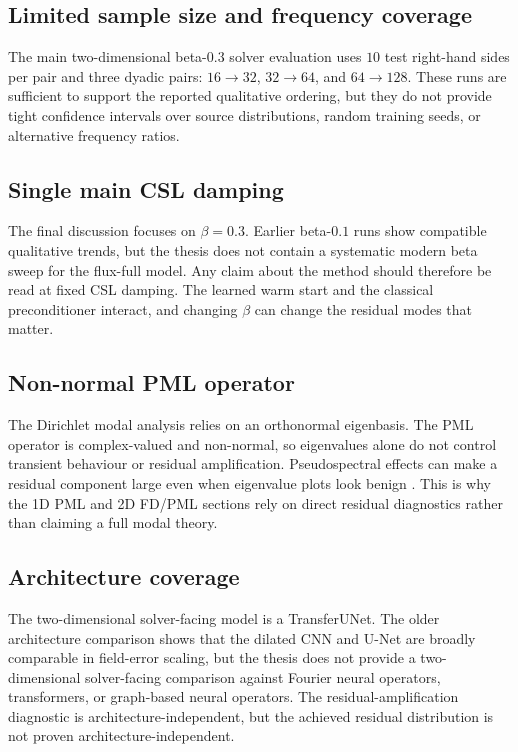 \subsection{Limited sample size and frequency coverage}
\label{subsec:discussion-limit-samples}

The main two-dimensional beta-$0.3$ solver evaluation uses $10$ test
right-hand sides per pair and three dyadic pairs:
$16\to32$, $32\to64$, and $64\to128$. These runs are sufficient to support the
reported qualitative ordering, but they do not provide tight confidence
intervals over source distributions, random training seeds, or alternative
frequency ratios.

\subsection{Single main CSL damping}
\label{subsec:discussion-limit-beta}

The final discussion focuses on $\beta=0.3$. Earlier beta-$0.1$ runs show
compatible qualitative trends, but the thesis does not contain a systematic
modern beta sweep for the flux-full model. Any claim about the method should
therefore be read at fixed CSL damping. The learned warm start and the
classical preconditioner interact, and changing $\beta$ can change the
residual modes that matter.

\subsection{Non-normal PML operator}
\label{subsec:discussion-limit-nonnormal}

The Dirichlet modal analysis relies on an orthonormal eigenbasis. The PML
operator is complex-valued and non-normal, so eigenvalues alone do not control
transient behaviour or residual amplification. Pseudospectral effects can
make a residual component large even when eigenvalue plots look benign
\cite{TrefethenEmbree2005}. This is why the 1D PML and 2D FD/PML sections rely on
direct residual diagnostics rather than claiming a full modal theory.

\subsection{Architecture coverage}
\label{subsec:discussion-limit-architecture}

The two-dimensional solver-facing model is a TransferUNet. The older
architecture comparison shows that the dilated CNN and U-Net are broadly
comparable in field-error scaling, but the thesis does not provide a
two-dimensional solver-facing comparison against Fourier neural operators,
transformers, or graph-based neural operators. The residual-amplification
diagnostic is architecture-independent, but the achieved residual distribution
is not proven architecture-independent.

